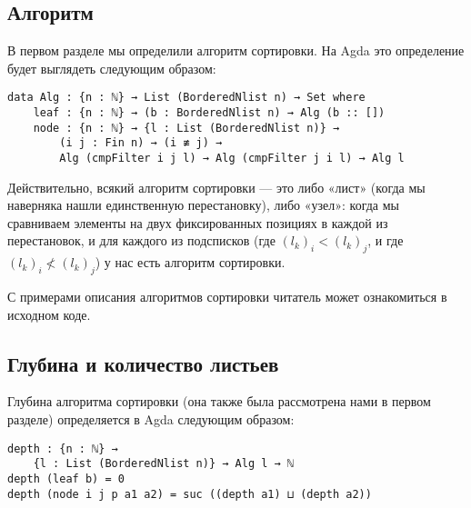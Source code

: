 
\subsection
[Алгоритм сортировки в Agda]
{Алгоритм}


\abz В первом разделе мы определили алгоритм сортировки. На Agda это определение будет выглядеть следующим образом:

\begin{verbatim}
data Alg : {n : ℕ} → List (BorderedNlist n) → Set where
    leaf : {n : ℕ} → (b : BorderedNlist n) → Alg (b :: [])
    node : {n : ℕ} → {l : List (BorderedNlist n)} →
        (i j : Fin n) → (i ≢ j) →
        Alg (cmpFilter i j l) → Alg (cmpFilter j i l) → Alg l
\end{verbatim}

Действительно, всякий алгоритм сортировки — это либо «лист» (когда мы наверняка нашли единственную перестановку), либо «узел»: когда мы сравниваем элементы на двух фиксированных позициях в каждой из перестановок, и для каждого из подсписков (где $(l_k)_i < (l_k)_j$, и где $(l_k)_i \not < (l_k)_j$) у нас есть алгоритм сортировки.

\abz С примерами описания алгоритмов сортировки читатель может ознакомиться в исходном коде.

\subsection
[Глубина и количество листьев алгоритма сортировки]
{Глубина и количество листьев}


\abz Глубина алгоритма сортировки (она также была рассмотрена нами в первом разделе) определяется в Agda следующим образом:

\begin{verbatim}
depth : {n : ℕ} →
    {l : List (BorderedNlist n)} → Alg l → ℕ
depth (leaf b) = 0
depth (node i j p a1 a2) = suc ((depth a1) ⊔ (depth a2))
\end{verbatim}

